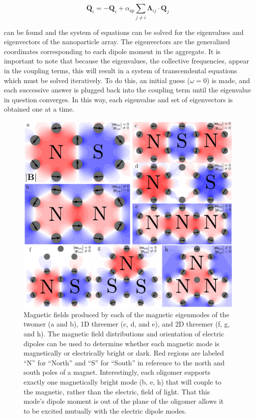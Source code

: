 \documentclass[12pt, letterpaper, twoside]{report}
\begin{document}
\begin{equation}
\ddot{\textbf{Q}}_{i} = -\textbf{Q}_{i} + \alpha_{\textrm{sp}}\sum_{j\neq i}\boldsymbol{\Lambda}_{ij}\cdot\textbf{Q}_{j}
\label{eom}
\end{equation}

\noindent can be found and the system of equations can be solved for the eigenvalues and eigenvectors of the nanoparticle array. The eigenvectors are the generalized coordinates corresponding to each dipole moment in the aggregate. It is important to note that because the eigenvalues, the collective frequencies, appear in the coupling terms, this will result in a system of transcendental equations which must be solved iteratively. To do this, an initial guess ($\omega = 0$) is made, and each successive answer is plugged back into the coupling term until the eigenvalue in question converges. In this way, each eigenvalue and set of eigenvectors is obtained one at a time.

\begin{figure}
\centering
\includegraphics[width=6in]{fields_new_arrows.pdf}
\caption{Magnetic fields produced by each of the magnetic eigenmodes of the twomer (a and b), 1D threemer (c, d, and e), and 2D threemer (f, g, and h). The magnetic field distributions and orientation of electric dipoles can be used to determine whether each magnetic mode is magnetically or electrically bright or dark. Red regions are labeled ``N'' for ``North'' and ``S'' for ``South'' in reference to the north and south poles of a magnet. Interestingly, each oligomer supports exactly one magnetically bright mode (b, e, h) that will couple to the magnetic, rather than the electric, field of light. That this mode's dipole moment is out of the plane of the oligomer allows it to be excited mutually with the electric dipole modes.}
\label{field_plots}
\end{figure}
\end{document}
